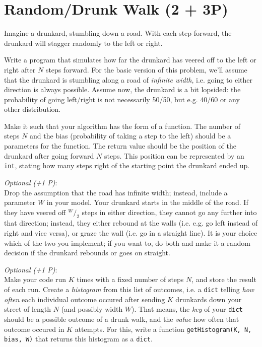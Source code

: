 \documentclass[
	english,
	fontsize=10pt,
	parskip=half,
	titlepage=true,
	DIV=12
]{scrartcl}
\newcommand*{\inPy}[1]{\texttt{#1}}
\newcommand*{\ie}{i.\;e. }
\newcommand*{\eg}{e.\;g. }
\begin{document}
\section{Random/Drunk Walk (2 + 3\;P)}
Imagine a drunkard, stumbling down a road. With each step forward, the drunkard will stagger randomly to the left or right.

Write a program that simulates how far the drunkard has veered off to the left or right after $N$ steps forward. For the basic version of this problem, we'll assume that the drunkard is stumbling along a road of \emph{infinite width}, \ie going to either direction is always possible. Assume now, the drunkard is a bit lopsided: the probability of going left/right is not necessarily 50/50, but \eg 40/60 or any other distribution.

Make it such that your algorithm has the form of a function. The number of steps $N$ and the bias (probability of taking a step to the left) should be a parameters for the function. The return value should be the position of the drunkard after going forward $N$ steps. This position can be represented by an \inPy{int}, stating how many steps right of the starting point the drunkard ended up.

\emph{Optional (+1 P)}:\\
Drop the assumption that the road has infinite width; instead, include a parameter $W$ in your model. Your drunkard starts in the middle of the road. If they have veered off $^{W}/_{2}$ steps in either direction, they cannot go any further into that direction; instead, they either rebound at the walls (\ie \eg go left instead of right and vice versa), or graze the wall (\ie go in a straight line). It is your choice which of the two you implement; if you want to, do both and make it a random decision if the drunkard rebounds or goes on straight.

\emph{Optional (+1 P)}:\\
Make your code run $K$ times with a fixed number of steps $N$, and store the result of each run. Create a \emph{histogram} from this list of outcomes, \ie a \inPy{dict} telling \emph{how often} each individual outcome occured after sending $K$ drunkards down your street of length $N$ (and possibly width $W$). That means, the \emph{key} of your \inPy{dict} should be a possible outcome of a drunk walk, and the \emph{value} how often that outcome occured in $K$ attempts. For this, write a function \inPy{getHistogram(K, N, bias, W)} that returns this histogram as a \inPy{dict}.
\end{document}
